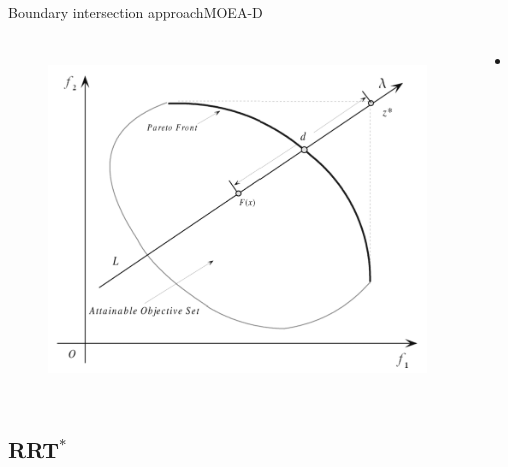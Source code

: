\begin{frame}{Boundary intersection approach}{MOEA-D}
	\begin{columns}
		\begin{figure}
			\centering
			\includegraphics[width=\linewidth]{figure/boundary_intersection}
			\label{fig:boundary_intersection}
		\end{figure}
		\begin{minipage}{\textwidth}
			\begin{itemize}
				\item 
			\end{itemize}
		\end{minipage}
	\end{columns}	
\end{frame}

\subsection{RRT$^{*}$}

